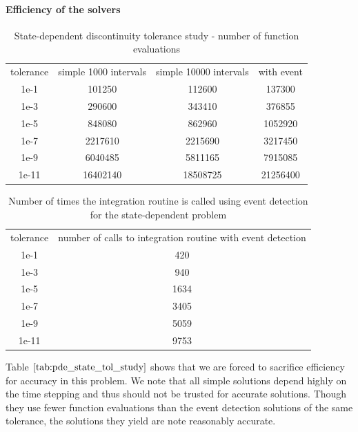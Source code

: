 \documentclass{article}
\begin{document}
\paragraph{Efficiency of the solvers}
\begin{table}[h]
\caption {State-dependent discontinuity tolerance study - number of function evaluations} 
\label{tab:pde_state_tol_study}
\begin{center}
\begin{tabular}{ c c c c } 
tolerance & simple 1000 intervals & simple 10000 intervals & with event \\ 
1e-1      &             101250   &              112600   &   137300 \\
1e-3      &             290600   &              343410   &   376855 \\
1e-5      &             848080   &              862960   &  1052920 \\
1e-7      &            2217610     &           2215690   &  3217450\\
1e-9      &            6040485     &           5811165   &  7915085  \\
1e-11     &           16402140     &          18508725   & 21256400 \\
\end{tabular}
\end{center}
\end{table}

\begin{table}[h]
\caption {Number of times the integration routine is called using event detection for the state-dependent problem} 
\label{tab:pde_state_tol_num_integrations}
\begin{center}
\begin{tabular}{ c c } 
tolerance & number of calls to integration routine with event detection \\ 
1e-1      &    420 \\
1e-3      &    940 \\
1e-5      & 1634 \\
1e-7      & 3405 \\
1e-9      & 5059 \\
1e-11     & 9753 \\
\end{tabular}
\end{center}
\end{table}

Table $\ref{tab:pde_state_tol_study}$ shows that we are forced to sacrifice efficiency for accuracy in this problem. We note that all simple solutions depend highly on the time stepping and thus should not be trusted for accurate solutions. Though they use fewer function evaluations than the event detection solutions of the same tolerance, the solutions they yield are note reasonably accurate. 
\end{document}
